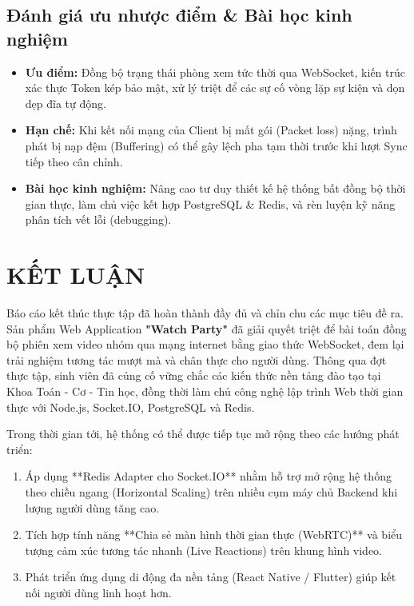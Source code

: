 \documentclass[12pt,a4paper]{extarticle}
\begin{document}
\subsection{Đánh giá ưu nhược điểm \& Bài học kinh nghiệm}
\begin{itemize}[leftmargin=1.2cm]
    \item \textbf{Ưu điểm:} Đồng bộ trạng thái phòng xem tức thời qua WebSocket, kiến trúc xác thực Token kép bảo mật, xử lý triệt để các sự cố vòng lặp sự kiện và dọn dẹp đĩa tự động.
    \item \textbf{Hạn chế:} Khi kết nối mạng của Client bị mất gói (Packet loss) nặng, trình phát bị nạp đệm (Buffering) có thể gây lệch pha tạm thời trước khi lượt Sync tiếp theo cân chỉnh.
    \item \textbf{Bài học kinh nghiệm:} Nâng cao tư duy thiết kế hệ thống bất đồng bộ thời gian thực, làm chủ việc kết hợp PostgreSQL \& Redis, và rèn luyện kỹ năng phân tích vết lỗi (debugging).
\end{itemize}

\newpage

\section*{KẾT LUẬN}

Báo cáo kết thúc thực tập đã hoàn thành đầy đủ và chỉn chu các mục tiêu đề ra. Sản phẩm Web Application \textbf{"Watch Party"} đã giải quyết triệt để bài toán đồng bộ phiên xem video nhóm qua mạng internet bằng giao thức WebSocket, đem lại trải nghiệm tương tác mượt mà và chân thực cho người dùng. Thông qua đợt thực tập, sinh viên đã củng cố vững chắc các kiến thức nền tảng đào tạo tại Khoa Toán - Cơ - Tin học, đồng thời làm chủ công nghệ lập trình Web thời gian thực với Node.js, Socket.IO, PostgreSQL và Redis.

Trong thời gian tới, hệ thống có thể được tiếp tục mở rộng theo các hướng phát triển:
\begin{enumerate}[leftmargin=1.2cm]
    \item Áp dụng **Redis Adapter cho Socket.IO** nhằm hỗ trợ mở rộng hệ thống theo chiều ngang (Horizontal Scaling) trên nhiều cụm máy chủ Backend khi lượng người dùng tăng cao.
    \item Tích hợp tính năng **Chia sẻ màn hình thời gian thực (WebRTC)** và biểu tượng cảm xúc tương tác nhanh (Live Reactions) trên khung hình video.
    \item Phát triển ứng dụng di động đa nền tảng (React Native / Flutter) giúp kết nối người dùng linh hoạt hơn.
\end{enumerate}
\end{document}
